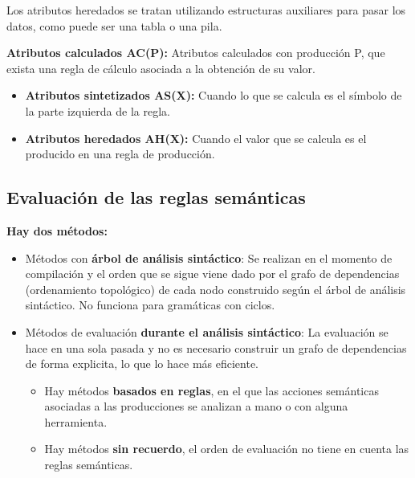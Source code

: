 \documentclass[12pt]{report} %
\begin{document}
Los atributos heredados se tratan utilizando estructuras auxiliares para pasar los datos, como puede ser una tabla o una pila.

\textbf{Atributos calculados AC(P):} Atributos calculados con producción P, que exista una regla de cálculo asociada a la obtención de su valor.
\begin{itemize}
  \item \textbf{Atributos sintetizados AS(X):} Cuando lo que se calcula es el símbolo de la parte izquierda de la regla.
  \item \textbf{Atributos heredados AH(X):} Cuando el valor que se calcula es el producido en una regla de producción.
\end{itemize}
\pagebreak
\subsection{Evaluación de las reglas semánticas}
\textbf{Hay dos métodos:}
\begin{itemize}
  \item Métodos con \textbf{árbol de análisis sintáctico}: Se realizan en el momento de compilación y el orden que se sigue viene dado por el grafo de dependencias (ordenamiento topológico) de cada nodo construido según el árbol de análisis sintáctico. No funciona para gramáticas con ciclos.
  \item Métodos de evaluación \textbf{durante el análisis sintáctico}: La evaluación se hace en una sola pasada y no es necesario construir un grafo de dependencias de forma explicita, lo que lo hace más eficiente. 
  \begin{itemize}
    \item Hay métodos \textbf{basados en reglas}, en el que las acciones semánticas asociadas a las producciones se analizan a mano o con alguna herramienta.
    \item Hay métodos \textbf{sin recuerdo}, el orden de evaluación no tiene en cuenta las reglas semánticas.
  \end{itemize}
\end{itemize}
\end{document}
